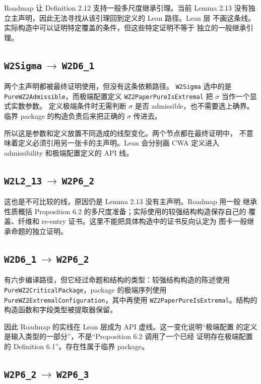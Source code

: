 \documentclass[UTF8,11pt,a4paper,fontset=none]{ctexart}
\DeclareRobustCommand{\id}[1]{\nolinkurl{#1}}
\newcommand{\arr}[2]{\id{#1}\,$\longrightarrow$\,\id{#2}}
\begin{document}
Roadmap 让 Definition 2.12 支持一般多尺度继承引理。当前 Lemma 2.13
没有独立主声明，因此无法寻找从该引理回到定义的 Lean 路径。Lean 层
不画这条线。实际构造中可以证明特定覆盖的条件，但这些特定证明不等于
独立的一般继承引理。

\subsection{\texorpdfstring{\arr{W2Sigma}{W2D6_1}}{W2Sigma 到 W2D6\_1}}

两个主声明都被最终证明使用，但没有这条依赖路径。
\id{W2Sigma} 选中的是 \id{PureWZ2Admissible}，而极端配置定义
\id{WZ2PaperPureIsExtremal} 把 $\sigma$ 当作一个显式实数参数。
定义极端条件时无需判断 $\sigma$ 是否 admissible，也不需要选上确界。
临界 package 的构造负责后来把正确的 $\sigma$ 传进去。

所以这是参数和定义放置不同造成的线型变化。两个节点都在最终证明中，
不意味着定义必须引用另一张卡的主声明。Lean 会分别画 CWA 定义进入
admissibility 和极端配置定义的 API 线。

\subsection{\texorpdfstring{\arr{W2L2_13}{W2P6_2}}{W2L2\_13 到 W2P6\_2}}

这也是不可比较的线，原因仍是 Lemma 2.13 没有主声明。Roadmap 用一般
继承性质概括 Proposition 6.2 的多尺度准备；实际使用的较强结构构造保存自己的
覆盖、纤维和 re-entry 证书。这里不能把具体构造中的证书反向认定为
图卡一般继承命题的独立证明。

\subsection{\texorpdfstring{\arr{W2D6_1}{W2P6_2}}{W2D6\_1 到 W2P6\_2}}

有六步编译路径，但它经过命题和结构的类型：较强结构构造的陈述使用
\id{PureWZ2CriticalPackage}，package 的极端序列使用
\id{PureWZ2ExtremalConfiguration}，其中再使用
\id{WZ2PaperPureIsExtremal}。结构的构造函数和字段类型被提取器保留。

因此 Roadmap 的实线在 Lean 层成为 API 虚线。这一变化说明“极端配置
的定义是输入类型的一部分”，不是“Proposition 6.2 调用了一个已经
证明存在极端配置的 Definition 6.1”。存在性属于临界 package。

\subsection{\texorpdfstring{\arr{W2P6_2}{W2P6_3}}{W2P6\_2 到 W2P6\_3}}
\end{document}
